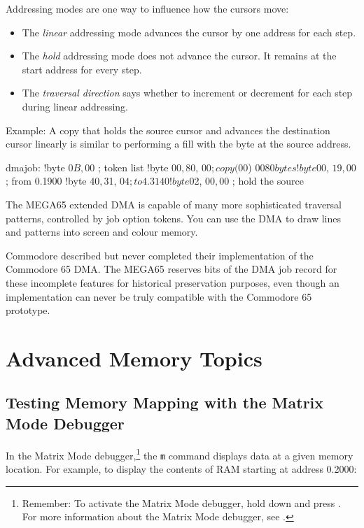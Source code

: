 Addressing modes are one way to influence how the cursors move:

\begin{itemize}
\item The {\em linear} addressing mode advances the cursor by one address for each step.
\item The {\em hold} addressing mode does not advance the cursor. It remains at the start address for every step.
\item The {\em traversal direction} says whether to increment or decrement for each step during linear addressing.
\end{itemize}

Example: A copy that holds the source cursor and advances the destination cursor linearly is similar to performing a fill with the byte at the source address.

\begin{asmcode}
dmajob:
!byte $0B, $00       ; token list
!byte $00, $80, $00  ; copy ($00) $0080 bytes
!byte $00, $19, $00  ; from 0.1900
!byte $40, $31, $04  ; to 4.3140
!byte $02, $00, $00  ; hold the source
\end{asmcode}

The MEGA65 extended DMA is capable of many more sophisticated traversal patterns, controlled by job option tokens. You can use the DMA to draw lines and patterns into screen and colour memory.

Commodore described but never completed their implementation of the Commodore 65 DMA. The MEGA65 reserves bits of the DMA job record for these incomplete features for historical preservation purposes, even though an implementation can never be truly compatible with the Commodore 65 prototype.


\newpage
\section{Advanced Memory Topics}

\subsection{Testing Memory Mapping with the Matrix Mode Debugger}

In the Matrix Mode debugger,\footnote{Remember: To activate the Matrix Mode debugger, hold down \megasymbolkey and press . For more information about the Matrix Mode debugger, see .} the \texttt{m} command displays data at a given memory location. For example, to display the contents of RAM starting at address 0.2000:

